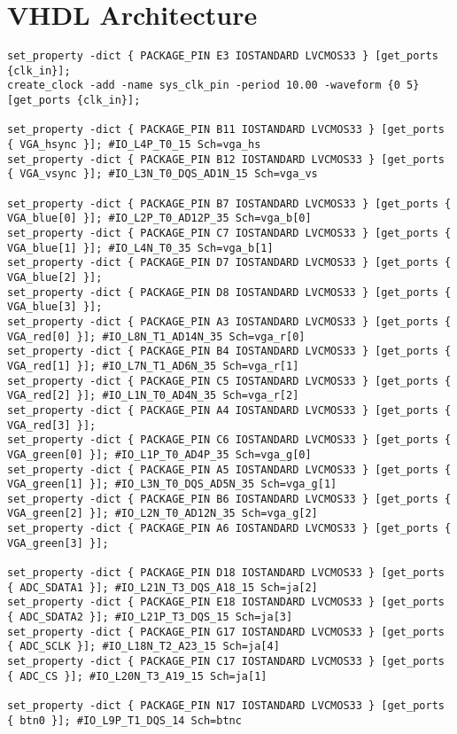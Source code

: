 \section{VHDL Architecture}
\begin{verbatim}
set_property -dict { PACKAGE_PIN E3 IOSTANDARD LVCMOS33 } [get_ports {clk_in}];
create_clock -add -name sys_clk_pin -period 10.00 -waveform {0 5} [get_ports {clk_in}];

set_property -dict { PACKAGE_PIN B11 IOSTANDARD LVCMOS33 } [get_ports { VGA_hsync }]; #IO_L4P_T0_15 Sch=vga_hs
set_property -dict { PACKAGE_PIN B12 IOSTANDARD LVCMOS33 } [get_ports { VGA_vsync }]; #IO_L3N_T0_DQS_AD1N_15 Sch=vga_vs

set_property -dict { PACKAGE_PIN B7 IOSTANDARD LVCMOS33 } [get_ports { VGA_blue[0] }]; #IO_L2P_T0_AD12P_35 Sch=vga_b[0]
set_property -dict { PACKAGE_PIN C7 IOSTANDARD LVCMOS33 } [get_ports { VGA_blue[1] }]; #IO_L4N_T0_35 Sch=vga_b[1]
set_property -dict { PACKAGE_PIN D7 IOSTANDARD LVCMOS33 } [get_ports { VGA_blue[2] }];
set_property -dict { PACKAGE_PIN D8 IOSTANDARD LVCMOS33 } [get_ports { VGA_blue[3] }];
set_property -dict { PACKAGE_PIN A3 IOSTANDARD LVCMOS33 } [get_ports { VGA_red[0] }]; #IO_L8N_T1_AD14N_35 Sch=vga_r[0]
set_property -dict { PACKAGE_PIN B4 IOSTANDARD LVCMOS33 } [get_ports { VGA_red[1] }]; #IO_L7N_T1_AD6N_35 Sch=vga_r[1]
set_property -dict { PACKAGE_PIN C5 IOSTANDARD LVCMOS33 } [get_ports { VGA_red[2] }]; #IO_L1N_T0_AD4N_35 Sch=vga_r[2]
set_property -dict { PACKAGE_PIN A4 IOSTANDARD LVCMOS33 } [get_ports { VGA_red[3] }];
set_property -dict { PACKAGE_PIN C6 IOSTANDARD LVCMOS33 } [get_ports { VGA_green[0] }]; #IO_L1P_T0_AD4P_35 Sch=vga_g[0]
set_property -dict { PACKAGE_PIN A5 IOSTANDARD LVCMOS33 } [get_ports { VGA_green[1] }]; #IO_L3N_T0_DQS_AD5N_35 Sch=vga_g[1]
set_property -dict { PACKAGE_PIN B6 IOSTANDARD LVCMOS33 } [get_ports { VGA_green[2] }]; #IO_L2N_T0_AD12N_35 Sch=vga_g[2]
set_property -dict { PACKAGE_PIN A6 IOSTANDARD LVCMOS33 } [get_ports { VGA_green[3] }];

set_property -dict { PACKAGE_PIN D18 IOSTANDARD LVCMOS33 } [get_ports { ADC_SDATA1 }]; #IO_L21N_T3_DQS_A18_15 Sch=ja[2]
set_property -dict { PACKAGE_PIN E18 IOSTANDARD LVCMOS33 } [get_ports { ADC_SDATA2 }]; #IO_L21P_T3_DQS_15 Sch=ja[3]
set_property -dict { PACKAGE_PIN G17 IOSTANDARD LVCMOS33 } [get_ports { ADC_SCLK }]; #IO_L18N_T2_A23_15 Sch=ja[4]
set_property -dict { PACKAGE_PIN C17 IOSTANDARD LVCMOS33 } [get_ports { ADC_CS }]; #IO_L20N_T3_A19_15 Sch=ja[1]

set_property -dict { PACKAGE_PIN N17 IOSTANDARD LVCMOS33 } [get_ports { btn0 }]; #IO_L9P_T1_DQS_14 Sch=btnc


\end{verbatim}
